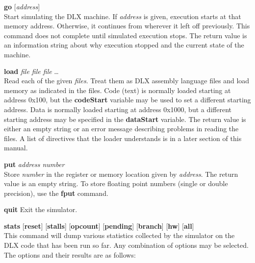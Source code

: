 \begin{mylist}
\begin{mylist}
\item[{\bf go} {[}{\em address}{]}]
\nopagebreak \hfill \\
Start simulating the DLX machine.  If {\em address} is given,
execution starts at that memory address.  Otherwise, it continues from
wherever it left off previously.  This command does not complete until
simulated execution stops.  The return value is an information string
about why execution stopped and the current state of the machine.

\item[{\bf load} {\em file file file} \ldots]
\nopagebreak \hfill \\
Read each of the given {\em files}.  Treat them as DLX assembly
language files and load memory as indicated in the files.  Code (text)
is normally loaded starting at address 0x100, but the {\bf codeStart}
variable may be used to set a different starting address.  Data is
normally loaded starting at address 0x1000, but a different starting
address may be specified in the {\bf dataStart} variable.  The return
value is either an empty string or an error message describing
problems in reading the files.  A list of directives that the loader
understands is in a later section of this manual.

\item[{\bf put} {\em address number}]
\nopagebreak \hfill \\
Store {\em number} in the register or memory location given by {\em
address}.  The return value is an empty string.  To store floating
point numbers (single or double precision), use the {\bf fput}
command.

\item[{\bf quit}\hfill]
Exit the simulator.

\item[{\bf stats} {[}{\bf reset}{]} {[}{\bf stalls}{]} {[}{\bf opcount}{]}
      {[}{\bf pending}{]} {[}{\bf branch}{]} {[}{\bf hw}{]} {[}{\bf all}{]}]
\nopagebreak \hfill \\
This command will dump various statistics collected by the simulator
on the DLX code that has been run so far.  Any combination of options
may be selected.  The options and their results are as follows:


\end{mylist}
\end{mylist}
